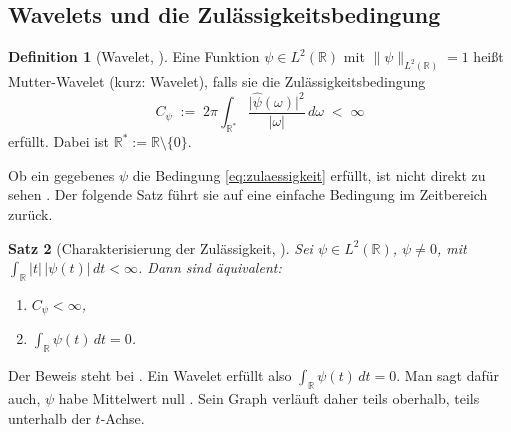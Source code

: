 \documentclass[a4paper,11pt,bibliography=totoc,listof=totoc,headinclude=true,cleardoublepage=empty,oneside]{scrbook}
\theoremstyle{plain}
\newtheorem{Satz}{Satz}[chapter]
\theoremstyle{definition}
\newtheorem{Definition}[Satz]{Definition}
\newcommand{\R}{\mathbb{R}}
\newcommand{\LZwei}{L^2(\R)}
\newcommand{\norm}[1]{\lVert #1 \rVert}
\begin{document}
\subsection{Wavelets und die Zulässigkeitsbedingung}
\label{subsec:zulaessigkeit}
 
\begin{Definition}[Wavelet, {\cite[Kap.~3.1, Bedingungen (1) und (2)]{blatter}}] %
\label{def:wavelet}
Eine Funktion $\psi \in \LZwei$ mit $\norm{\psi}_{\LZwei} = 1$ hei\ss{}t
Mutter-Wavelet (kurz: Wavelet), falls sie die Zulässigkeitsbedingung
\begin{equation}
\label{eq:zulaessigkeit}
  C_\psi \;:=\; 2\pi \int_{\R^*} \frac{\lvert \hat\psi(\omega)\rvert^2}{\lvert\omega\rvert}\, d\omega \;<\; \infty
\end{equation}
erfüllt. Dabei ist $\R^* := \R\setminus\{0\}$.
\end{Definition}

Ob ein gegebenes $\psi$ die Bedingung \eqref{eq:zulaessigkeit} erfüllt, ist
nicht direkt zu sehen \cite[Kap.~3.1]{blatter}. %
Der folgende Satz führt sie auf eine einfache Bedingung im Zeitbereich zurück.

\begin{Satz}[Charakterisierung der Zulässigkeit, {\cite[Satz~(3.1)]{blatter}}] %
\label{satz:zulaessigkeit-mittelwert}
Sei $\psi \in \LZwei$, $\psi \neq 0$, mit $\int_\R \lvert t\rvert\,\lvert\psi(t)\rvert\,dt < \infty$.
Dann sind äquivalent:
\begin{enumerate}
\item[(i)] $C_\psi < \infty$,
\item[(ii)] $\displaystyle\int_\R \psi(t)\,dt = 0$.
\end{enumerate}
\end{Satz}

Der Beweis steht bei \cite[Satz~(3.1)]{blatter}. %
Ein Wavelet erfüllt also $\int_\R \psi(t)\,dt = 0$. Man sagt dafür auch, $\psi$
habe Mittelwert null \cite[Kap.~3.1]{blatter}. %
Sein Graph verläuft daher teils oberhalb, teils unterhalb der $t$-Achse.
\end{document}
